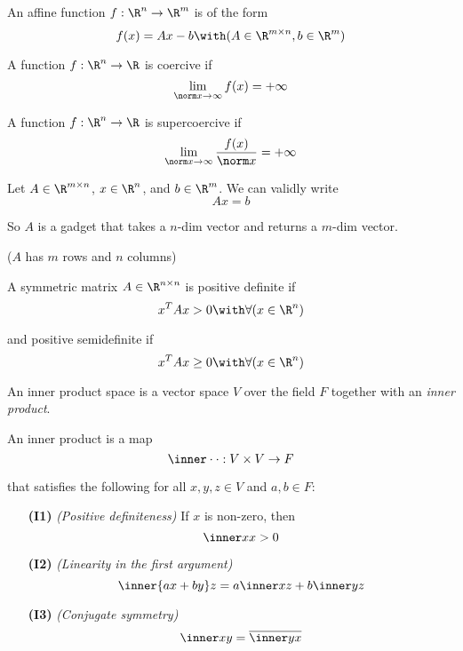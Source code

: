 
\label{dcb7f73}

An affine function $f:\R^n\to\R^m$ is of the form
$$
  f(x)=Ax-b\with(A\in\R^{m\times n},b\in\R^m)
$$

\label{e9c7871}

A function $f:\R^n\to\R$ is coercive if
$$
  \lim_{\norm x\to\infty}f(x)=+\infty
$$

\label{a0444cc}

A function $f:\R^n\to\R$ is supercoercive if
$$
  \lim_{\norm x\to\infty}\frac{f(x)}{\norm x}=+\infty
$$


\label{d8bd136}

Let $A\in\R^{m\times n}$, $x\in\R^n$, and $b\in\R^m$. We can validly write
$$
  Ax = b
$$

So $A$ is a gadget that takes a $n$-dim vector and returns a $m$-dim vector.

($A$ has $m$ rows and $n$ columns)

\label{e25e722}

A symmetric matrix $A\in\R^{n\times n}$ is positive definite if
$$
  x^TAx>0\with\forall(x\in\R^n)
$$

and positive semidefinite if
$$
  x^TAx\geq0\with\forall(x\in\R^n)
$$

\label{cebd07a}

An inner product space is a vector space $V$ over the field $F$ together with
an \textit{inner product}.

An inner product is a map
$$
  \inner\cdot\cdot:V\times V\to F
$$

that satisfies the following for all $x,y,z\in V$ and $a,b\in F$:
\begin{enumerate}
  \item[\textbf{(I1)}] \textit{(Positive definiteness)} If $x$ is
        non-zero, then
        $$
          \inner xx>0
        $$
  \item[\textbf{(I2)}] \textit{(Linearity in the first argument)}
        $$
          \inner{ax+by}z = a\inner xz + b\inner yz
        $$
  \item[\textbf{(I3)}] \textit{(Conjugate symmetry)}
        $$
          \inner xy=\overline{\inner yx}
        $$
\end{enumerate}

